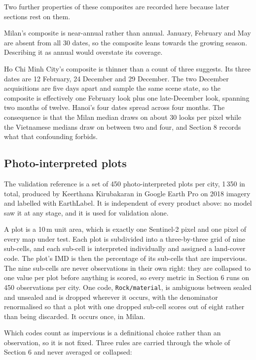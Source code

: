 \documentclass[11pt,a4paper]{article}
\begin{document}
Two further properties of these composites are recorded here because later
sections rest on them.

Milan's composite is near-annual rather than annual. January, February and May
are absent from all 30 dates, so the composite leans towards the growing season.
Describing it as annual would overstate its coverage.

Ho Chi Minh City's composite is thinner than a count of three suggests. Its
three dates are 12 February, 24 December and 29 December. The two December
acquisitions are five days apart and sample the same scene state, so the
composite is effectively one February look plus one late-December look, spanning
two months of twelve. Hanoi's four dates spread across four months. The
consequence is that the Milan median draws on about 30 looks per pixel while the
Vietnamese medians draw on between two and four, and Section 8 records what that
confounding forbids.

\subsection{Photo-interpreted plots}

The validation reference is a set of 450 photo-interpreted plots per city, 1\,350
in total, produced by Keerthana Kirubakaran in Google Earth Pro on 2018 imagery
and labelled with EarthLabel. It is independent of every product above: no model
saw it at any stage, and it is used for validation alone.

A plot is a 10\,m unit area, which is exactly one Sentinel-2 pixel and one pixel
of every map under test. Each plot is subdivided into a three-by-three grid of
nine sub-cells, and each sub-cell is interpreted individually and assigned a
land-cover code. The plot's IMD is then the percentage of its sub-cells that are
impervious. The nine sub-cells are never observations in their own right: they
are collapsed to one value per plot before anything is scored, so every metric
in Section 6 runs on 450 observations per city. One code, \texttt{Rock/material}, is
ambiguous between sealed and unsealed and is dropped wherever it occurs, with
the denominator renormalised so that a plot with one dropped sub-cell scores out
of eight rather than being discarded. It occurs once, in Milan.

Which codes count as impervious is a definitional choice rather than an
observation, so it is not fixed. Three rules are carried through the whole of
Section 6 and never averaged or collapsed:
\end{document}
